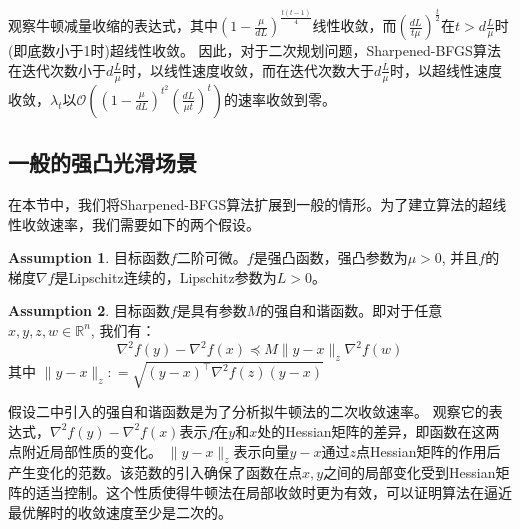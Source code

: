 \documentclass[a4paper,twoside,AutoFakeBold]{article}
\theoremstyle{definition}
\newtheorem{assumption}{Assumption}[section]
\begin{document}
观察牛顿减量收缩的表达式，其中$\left(1 - \frac{\mu}{dL}\right)^{\frac{t(t - 1)}{4}}$线性收敛，而$\left(\frac{dL}{t\mu}\right)^{\frac{t}{2}}$在$t>d\frac{L}{\mu}$时(即底数小于1时)超线性收敛。
因此，对于二次规划问题，Sharpened-BFGS算法在迭代次数小于$d\frac{L}{\mu}$时，以线性速度收敛，而在迭代次数大于$d\frac{L}{\mu}$时，以超线性速度收敛，$\lambda_t$以$\mathcal{O}((1-\frac{\mu}{dL})^{t^2} (\frac{dL}{\mu t})^t)$的速率收敛到零。


\subsection{一般的强凸光滑场景}

在本节中，我们将Sharpened-BFGS算法扩展到一般的情形。为了建立算法的超线性收敛速率，我们需要如下的两个假设。
\begin{assumption}
    目标函数$f$二阶可微。$f$是强凸函数，强凸参数为$\mu>0$, 并且$f$的梯度$\nabla f$是Lipschitz连续的，Lipschitz参数为$L>0$。
\end{assumption}
\begin{assumption}
    目标函数$f$是具有参数$M$的强自和谐函数。即对于任意$x,y,z,w\in \mathbb{R}^n$, 我们有：
    \begin{equation}
        \nabla^{2}{f(y)} - \nabla^{2}{f(x)} \preceq M\|y - x\|_{z}\nabla^{2}{f(w)}
    \end{equation}
    其中 $\|y - x\|_{z} : = \sqrt{(y - x)^\top \nabla^2{f(z)} (y - x)}$
\end{assumption}

假设二中引入的强自和谐函数是为了分析拟牛顿法的二次收敛速率。
观察它的表达式，$\nabla^{2}{f(y)} - \nabla^{2}{f(x)}$表示$f$在$y$和$x$处的Hessian矩阵的差异，即函数在这两点附近局部性质的变化。
$\|y - x\|_{z}$表示向量$y-x$通过$z$点Hessian矩阵的作用后产生变化的范数。该范数的引入确保了函数在点$x,y$之间的局部变化受到Hessian矩阵的适当控制。这个性质使得牛顿法在局部收敛时更为有效，可以证明算法在逼近最优解时的收敛速度至少是二次的。
\end{document}
